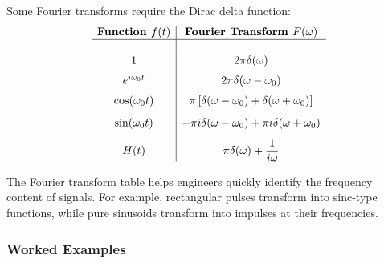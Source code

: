 \begin{conceptbox}
    Some Fourier transforms require the Dirac delta function:
    \[
        \begin{array}{c|c}
            \textbf{Function } f(t) & \textbf{Fourier Transform } F(\omega)                           \\ \hline \\[1pt]
            1                       & 2\pi\delta(\omega)                                              \\[6pt]
            e^{i\omega_0t}          & 2\pi\delta(\omega-\omega_0)                                     \\[6pt]
            \cos(\omega_0t)         & \pi\left[\delta(\omega-\omega_0)+\delta(\omega+\omega_0)\right] \\[8pt]
            \sin(\omega_0t)         & -\pi i\delta(\omega-\omega_0)+\pi i\delta(\omega+\omega_0)      \\[8pt]
            H(t)                    & \pi\delta(\omega)+\dfrac{1}{i\omega}
        \end{array}
    \]
\end{conceptbox}

\begin{noteBox}
    The Fourier transform table helps engineers quickly identify the frequency content of signals. For example, rectangular pulses transform into sinc-type functions, while pure sinusoids transform into impulses at their frequencies.
\end{noteBox}

\subsubsection*{Worked Examples}

